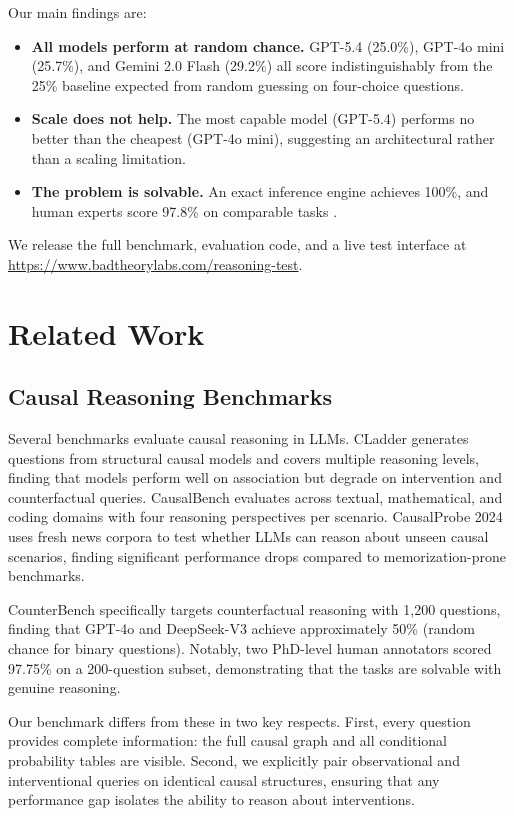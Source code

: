 \documentclass[11pt,a4paper]{article}
\begin{document}
Our main findings are:

\begin{itemize}
  \item \textbf{All models perform at random chance.} GPT-5.4 (25.0\%), GPT-4o mini (25.7\%), and Gemini 2.0 Flash (29.2\%) all score indistinguishably from the 25\% baseline expected from random guessing on four-choice questions.
  \item \textbf{Scale does not help.} The most capable model (GPT-5.4) performs no better than the cheapest (GPT-4o mini), suggesting an architectural rather than a scaling limitation.
  \item \textbf{The problem is solvable.} An exact inference engine achieves 100\%, and human experts score 97.8\% on comparable tasks \cite{counterbench}.
\end{itemize}

We release the full benchmark, evaluation code, and a live test interface at \url{https://www.badtheorylabs.com/reasoning-test}.

\section{Related Work}

\subsection{Causal Reasoning Benchmarks}

Several benchmarks evaluate causal reasoning in LLMs. CLadder \cite{jin2024cladder} generates questions from structural causal models and covers multiple reasoning levels, finding that models perform well on association but degrade on intervention and counterfactual queries. CausalBench \cite{causalbench} evaluates across textual, mathematical, and coding domains with four reasoning perspectives per scenario. CausalProbe 2024 \cite{causalprobe} uses fresh news corpora to test whether LLMs can reason about unseen causal scenarios, finding significant performance drops compared to memorization-prone benchmarks.

CounterBench \cite{counterbench} specifically targets counterfactual reasoning with 1,200 questions, finding that GPT-4o and DeepSeek-V3 achieve approximately 50\% (random chance for binary questions). Notably, two PhD-level human annotators scored 97.75\% on a 200-question subset, demonstrating that the tasks are solvable with genuine reasoning.

Our benchmark differs from these in two key respects. First, every question provides complete information: the full causal graph and all conditional probability tables are visible. Second, we explicitly pair observational and interventional queries on identical causal structures, ensuring that any performance gap isolates the ability to reason about interventions.
\end{document}
